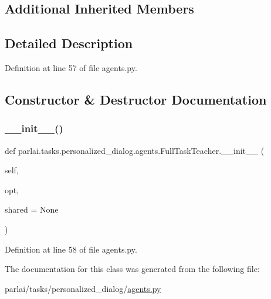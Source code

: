 \subsection*{Additional Inherited Members}


\subsection{Detailed Description}


Definition at line 57 of file agents.\+py.



\subsection{Constructor \& Destructor Documentation}
\mbox{\label{classparlai_1_1tasks_1_1personalized__dialog_1_1agents_1_1FullTaskTeacher_a2f07307405aafc3bc903ce7f172f45c0}} 
\subsubsection{\texorpdfstring{\+\_\+\+\_\+init\+\_\+\+\_\+()}{\_\_init\_\_()}}
{\footnotesize\ttfamily def parlai.\+tasks.\+personalized\+\_\+dialog.\+agents.\+Full\+Task\+Teacher.\+\_\+\+\_\+init\+\_\+\+\_\+ (\begin{DoxyParamCaption}\item[{}]{self,  }\item[{}]{opt,  }\item[{}]{shared = {\ttfamily None} }\end{DoxyParamCaption})}



Definition at line 58 of file agents.\+py.



The documentation for this class was generated from the following file\+:\begin{DoxyCompactItemize}
\item 
parlai/tasks/personalized\+\_\+dialog/\hyperlink{parlai_2tasks_2personalized__dialog_2agents_8py}{agents.\+py}\end{DoxyCompactItemize}
